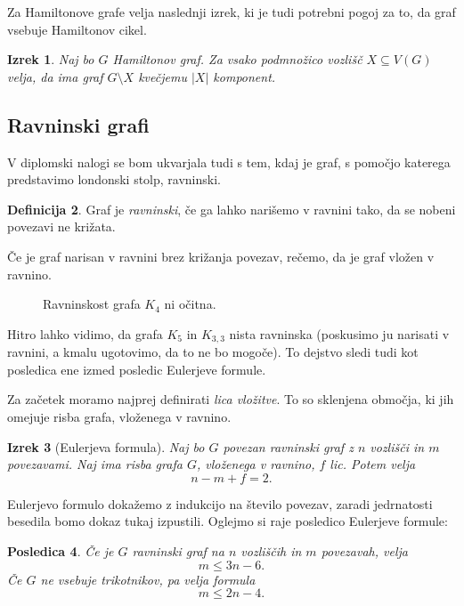 \documentclass[12pt,a4paper]{amsart}
\theoremstyle{definition} %
\newtheorem{definicija}{Definicija}[section]
\theoremstyle{plain} %
\newtheorem{izrek}[definicija]{Izrek}
\newtheorem{posledica}[definicija]{Posledica}
\begin{document}
Za Hamiltonove grafe velja naslednji izrek, ki je tudi potrebni pogoj za to, da graf vsebuje Hamiltonov cikel.

\begin{izrek}
	Naj bo $G$ Hamiltonov graf. Za vsako podmnožico vozlišč $X \subseteq V(G)$ velja, da ima graf $G \setminus X$ kvečjemu $|X|$ komponent.
\end{izrek}

\proof

\endproof

\subsection{Ravninski grafi}

V diplomski nalogi se bom ukvarjala tudi s tem, kdaj je graf, s pomočjo katerega predstavimo londonski stolp, ravninski.

\begin{definicija}
    Graf je \emph{ravninski}, če ga lahko narišemo v ravnini tako, da se nobeni povezavi ne križata.
\end{definicija}

Če je graf narisan v ravnini brez križanja povezav, rečemo, da je graf vložen v ravnino.

\begin{figure}[h]
    \caption{Ravninskost grafa $K_4$ ni očitna.}
\end{figure}

Hitro lahko vidimo, da grafa $K_5$ in $K_{3,3}$ nista ravninska (poskusimo ju narisati v ravnini, a kmalu ugotovimo, da to ne bo mogoče). To dejstvo sledi tudi kot posledica ene izmed posledic Eulerjeve formule.

Za začetek moramo najprej definirati \emph{lica vložitve}. To so sklenjena območja, ki jih omejuje risba grafa, vloženega v ravnino.

\begin{izrek}[Eulerjeva formula]
    Naj bo $G$ povezan ravninski graf z $n$ vozlišči in $m$ povezavami. Naj ima risba grafa $G$, vloženega v ravnino, $f$ lic. Potem velja
    \[ n - m + f = 2 .\]
\end{izrek}

Eulerjevo formulo dokažemo z indukcijo na število povezav, zaradi jedrnatosti besedila bomo dokaz tukaj izpustili. Oglejmo si raje posledico Eulerjeve formule:

\begin{posledica}
    Če je $G$ ravninski graf na $n$ vozliščih in $m$ povezavah, velja
    \begin{equation} 
    \label{eq:posledica-euler-formula}
    m \leq 3n - 6.
    \end{equation}
    Če $G$ ne vsebuje trikotnikov, pa velja formula
    \begin{equation} 
    \label{eq:posledica-euler-formula-trik}
    m \leq 2n - 4.
    \end{equation}
\end{posledica}
\end{document}
